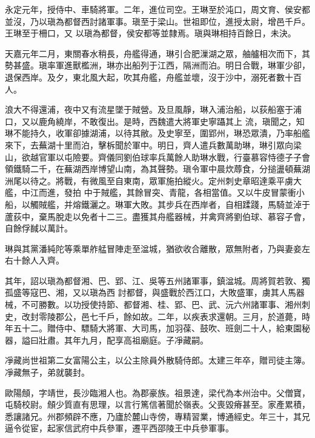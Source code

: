 \begin{pinyinscope}
 永定元年，授侍中、車騎將軍。二年，進位司空。王琳至於沌口，周文育、侯安都並沒，乃以瑱為都督西討諸軍事。瑱至于梁山。世祖即位，進授太尉，增邑千戶。王琳至于柵口，又
 以瑱為都督，侯安都等並隸焉。瑱與琳相持百餘日，未決。



 天嘉元年二月，東關春水稍長，舟艦得通，琳引合肥漅湖之眾，舳艫相次而下，其勢甚盛。瑱率軍進獸檻洲，琳亦出船列于江西，隔洲而泊。明日合戰，琳軍少卻，退保西岸。及夕，東北風大起，吹其舟艦，舟艦並壞，沒于沙中，溺死者數十百人。



 浪大不得還浦，夜中又有流星墜于賊營。及旦風靜，琳入浦治船，以荻船塞于浦口，又以鹿角繞岸，不敢復出。是時，西魏遣大將軍史寧躡其上
 流，瑱聞之，知琳不能持久，收軍卻據湖浦，以待其敝。及史寧至，圍郢州，琳恐眾潰，乃率船艦來下，去蕪湖十里而泊，擊柝聞於軍中。明日，齊人遣兵數萬助琳，琳引眾向梁山，欲越官軍以屯險要。齊儀同劉伯球率兵萬餘人助琳水戰，行臺慕容恃德子子會領鐵騎二千，在蕪湖西岸博望山南，為其聲勢。瑱令軍中晨炊蓐食，分搥盪頓蕪湖洲尾以待之。將戰，有微風至自東南，眾軍施拍縱火。定州刺史章昭達乘平虜大艦，中江而進，發拍
 中于賊艦，其餘冒突、青龍，各相當值。又以牛皮冒蒙衝小船，以觸賊艦，并熔鐵灑之。琳軍大敗。其步兵在西岸者，自相蹂踐，馬騎並淖于蘆荻中，棄馬脫走以免者十二三。盡獲其舟艦器械，并禽齊將劉伯球、慕容子會，自餘俘馘以萬計。



 琳與其黨潘純陀等乘單舴艋冒陣走至湓城，猶欲收合離散，眾無附者，乃與妻妾左右十餘人入齊。



 其年，詔以瑱為都督湘、巴、郢、江、吳等五州諸軍事，鎮湓城。周將賀若敦、獨孤盛等寇巴、湘，又以瑱為西
 討都督，與盛戰於西江口，大敗盛軍，虜其人馬器械，不可勝數。以功授使持節、都督湘、桂、郢、巴、武、沅六州諸軍事、湘州刺史，改封零陵郡公，邑七千戶，餘如故。二年，以疾表求還朝。三月，於道薨，時年五十二。贈侍中、驃騎大將軍、大司馬，加羽葆、鼓吹、班劍二十人，給東園秘器，謚曰壯肅。其年九月，配享高祖廟庭。子凈藏嗣。



 凈藏尚世祖第二女富陽公主，以公主除員外散騎侍郎。太建三年卒，贈司徒主簿。凈藏無子，弟就襲封。



 歐陽頠，字靖世，長沙臨湘人也。為郡豪族。祖景達，梁代為本州治中。父僧寶，屯騎校尉。頠少質直有思理，以言行篤信著聞於嶺表。父喪毀瘠甚至。家產累積，悉讓諸兄。州郡頻辟不應，乃廬於麓山寺傍，專精習業，博通經史。年三十，其兄逼令從宦，起家信武府中兵參軍，遷平西邵陵王中兵參軍事。




\end{pinyinscope}
